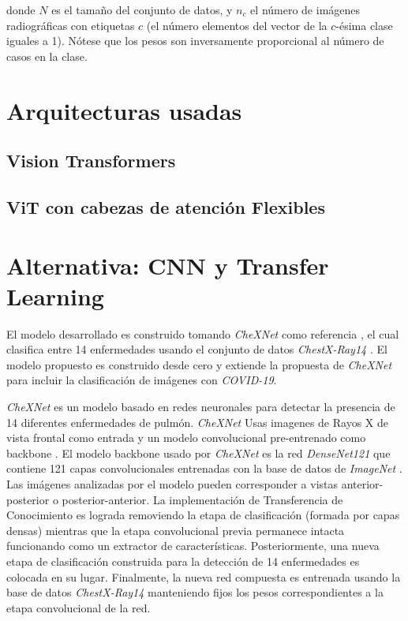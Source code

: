 {donde $N$ es el tamaño del conjunto de datos, y $n_c$ el número de imágenes radiográficas con
etiquetas $c$ (el número elementos del vector de la $c$-ésima clase iguales a 1). Nótese que los
pesos son inversamente proporcional al número de casos en la clase.


\section{Arquitecturas usadas}
\subsection{Vision Transformers}
\subsection{ViT con cabezas de atención Flexibles}

\section{Alternativa: CNN y Transfer Learning}

El modelo desarrollado es construido tomando \textit{CheXNet} como referencia
\cite{rajpurkar2018deep}, el cual clasifica entre 14 enfermedades
usando el conjunto de datos \textit{ChestX-Ray14} \cite{wang2017chestx}. El modelo propuesto es
construido desde cero y extiende la propuesta de \textit{CheXNet} para incluir la clasificación de
imágenes con \textit{COVID-19}.

\textit{CheXNet} es un modelo basado en redes neuronales para detectar la presencia de 14 diferentes
enfermedades de pulmón. \textit{CheXNet} Usas imagenes de Rayos X de vista frontal como entrada y
un modelo convolucional pre-entrenado como backbone \cite{rajpurkar2018deep}. El modelo backbone usado
por \textit{CheXNet} es la red \textit{DenseNet121} \cite{huang2017densely} que contiene 121 capas
convolucionales entrenadas con la base de datos de \textit{ImageNet} \cite{ILSVRC15}. Las imágenes
analizadas por el modelo pueden corresponder a vistas anterior-posterior o posterior-anterior. La
implementación de Transferencia de Conocimiento es lograda removiendo la etapa de clasificación
(formada por capas densas) mientras que la etapa convolucional previa permanece intacta funcionando
como un extractor de características. Posteriormente, una nueva etapa de clasificación construida
para la detección de 14 enfermedades es colocada en su lugar. Finalmente, la nueva red compuesta
es entrenada usando la base de datos \textit{ChestX-Ray14} manteniendo fijos los pesos
correspondientes a la etapa convolucional de la red.

}
